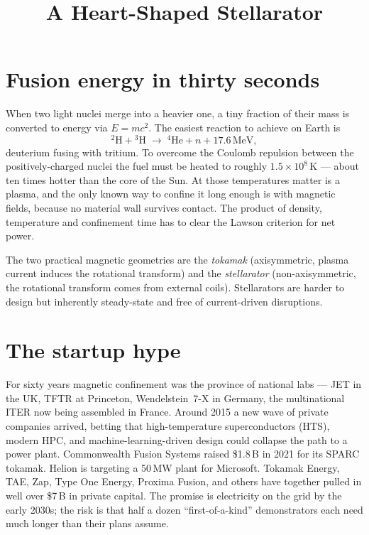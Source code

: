 \documentclass[11pt,a4paper]{article}
\title{A Heart-Shaped Stellarator}
\author{}
\date{}
\begin{document}
\maketitle

\section*{Fusion energy in thirty seconds}

When two light nuclei merge into a heavier one, a tiny fraction of their
mass is converted to energy via $E = mc^{2}$. The easiest reaction to
achieve on Earth is
\[
  {}^{2}\mathrm{H} + {}^{3}\mathrm{H}
    \;\longrightarrow\; {}^{4}\mathrm{He} + n + 17.6\,\mathrm{MeV},
\]
deuterium fusing with tritium. To overcome the Coulomb repulsion between
the positively-charged nuclei the fuel must be heated to roughly
$1.5\times 10^{8}\,\mathrm{K}$ --- about ten times hotter than the core
of the Sun. At those temperatures matter is a plasma, and the only known
way to confine it long enough is with magnetic fields, because no material
wall survives contact. The product of density, temperature and confinement
time has to clear the Lawson criterion for net power.

The two practical magnetic geometries are the \emph{tokamak} (axisymmetric,
plasma current induces the rotational transform) and the \emph{stellarator}
(non-axisymmetric, the rotational transform comes from external coils).
Stellarators are harder to design but inherently steady-state and free of
current-driven disruptions.

\section*{The startup hype}

For sixty years magnetic confinement was the province of national labs ---
JET in the UK, TFTR at Princeton, Wendelstein~7-X in Germany, the
multinational ITER now being assembled in France. Around 2015 a new wave
of private companies arrived, betting that high-temperature superconductors
(HTS), modern HPC, and machine-learning-driven design could collapse the
path to a power plant. Commonwealth Fusion Systems raised \$1.8\,B in 2021
for its SPARC tokamak. Helion is targeting a 50\,MW plant for Microsoft.
Tokamak Energy, TAE, Zap, Type One Energy, Proxima Fusion, and others have
together pulled in well over \$7\,B in private capital. The promise is
electricity on the grid by the early 2030s; the risk is that half a dozen
``first-of-a-kind'' demonstrators each need much longer than their plans
assume.
\end{document}
